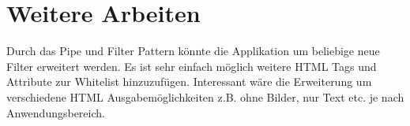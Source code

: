 \section{Weitere Arbeiten}

Durch das Pipe und Filter Pattern könnte die Applikation um beliebige neue Filter erweitert werden. Es ist sehr einfach möglich weitere HTML Tags und Attribute zur Whitelist hinzuzufügen. Interessant wäre die Erweiterung um verschiedene HTML Ausgabemöglichkeiten z.B. ohne Bilder, nur Text etc. je nach Anwendungsbereich.

